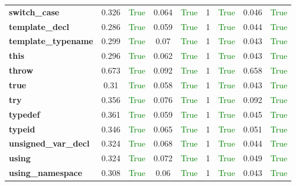 \documentclass{article}
\begin{document}
\begin{xltabular}{\textwidth}{lcccccccc}
\textbf{{\fontsize{10}{12}\selectfont switch\_case}}& 0.326&\textcolor{green}{True}& 0.064&\textcolor{green}{True}& 1&\textcolor{green}{True}& 0.046&\textcolor{green}{True} \\[0.5ex]
\textbf{{\fontsize{10}{12}\selectfont template\_decl}}& 0.286&\textcolor{green}{True}& 0.059&\textcolor{green}{True}& 1&\textcolor{green}{True}& 0.044&\textcolor{green}{True} \\[0.5ex]
\textbf{{\fontsize{10}{12}\selectfont template\_typename}}& 0.299&\textcolor{green}{True}& 0.07&\textcolor{green}{True}& 1&\textcolor{green}{True}& 0.043&\textcolor{green}{True} \\[0.5ex]
\textbf{{\fontsize{10}{12}\selectfont this}}& 0.296&\textcolor{green}{True}& 0.062&\textcolor{green}{True}& 1&\textcolor{green}{True}& 0.043&\textcolor{green}{True} \\[0.5ex]
\textbf{{\fontsize{10}{12}\selectfont throw}}& 0.673&\textcolor{green}{True}& 0.092&\textcolor{green}{True}& 1&\textcolor{green}{True}& 0.658&\textcolor{green}{True} \\[0.5ex]
\textbf{{\fontsize{10}{12}\selectfont true}}& 0.31&\textcolor{green}{True}& 0.058&\textcolor{green}{True}& 1&\textcolor{green}{True}& 0.043&\textcolor{green}{True} \\[0.5ex]
\textbf{{\fontsize{10}{12}\selectfont try}}& 0.356&\textcolor{green}{True}& 0.076&\textcolor{green}{True}& 1&\textcolor{green}{True}& 0.092&\textcolor{green}{True} \\[0.5ex]
\textbf{{\fontsize{10}{12}\selectfont typedef}}& 0.361&\textcolor{green}{True}& 0.059&\textcolor{green}{True}& 1&\textcolor{green}{True}& 0.045&\textcolor{green}{True} \\[0.5ex]
\textbf{{\fontsize{10}{12}\selectfont typeid}}& 0.346&\textcolor{green}{True}& 0.065&\textcolor{green}{True}& 1&\textcolor{green}{True}& 0.051&\textcolor{green}{True} \\[0.5ex]
\textbf{{\fontsize{10}{12}\selectfont unsigned\_var\_decl}}& 0.324&\textcolor{green}{True}& 0.068&\textcolor{green}{True}& 1&\textcolor{green}{True}& 0.044&\textcolor{green}{True} \\[0.5ex]
\textbf{{\fontsize{10}{12}\selectfont using}}& 0.324&\textcolor{green}{True}& 0.072&\textcolor{green}{True}& 1&\textcolor{green}{True}& 0.049&\textcolor{green}{True} \\[0.5ex]
\textbf{{\fontsize{10}{12}\selectfont using\_namespace}}& 0.308&\textcolor{green}{True}& 0.06&\textcolor{green}{True}& 1&\textcolor{green}{True}& 0.043&\textcolor{green}{True} \\[0.5ex]

\end{xltabular}
\end{document}
